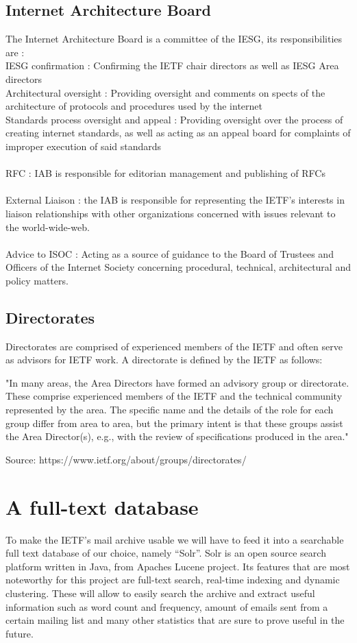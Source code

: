 \documentclass{report}
\begin{document}
\section{Internet Architecture Board}
The Internet Architecture Board is a committee of the IESG, its responsibilities are :\\
IESG confirmation : Confirming the IETF chair directors as well as IESG Area directors
\\Architectural oversight : Providing oversight and comments on spects of the architecture of protocols and procedures used by the internet 
\\Standards process oversight and appeal : Providing oversight over the process of creating internet standards, as well as acting as an appeal board for complaints of improper execution of said standards\\
\\RFC  : IAB is responsible for editorian management and publishing of RFCs\\
\\External Liaison  : the IAB is responsible for representing the IETF’s interests in liaison relationships with other organizations concerned with issues relevant to the world-wide-web.\\
\\Advice to ISOC : Acting as a source of guidance to the Board of Trustees and Officers of the Internet Society concerning procedural, technical, architectural and policy matters. \\


\section{Directorates}
Directorates are comprised of experienced members of the IETF and often serve as advisors for IETF work. A directorate is defined by the IETF as follows:

"In many areas, the Area Directors have formed an advisory group or directorate. These comprise experienced members of the IETF and the technical community represented by the area. The specific name and the details of the role for each group differ from area to area, but the primary intent is that these groups assist the Area Director(s), e.g., with the review of specifications produced in the area."

Source: https://www.ietf.org/about/groups/directorates/

\chapter{A full-text database}
To make the IETF’s mail archive usable we will have to feed it into a searchable full text database of our choice, namely “Solr”. Solr is an open source search platform written in Java, from Apaches Lucene project. Its features that are most noteworthy for this project are full-text search, real-time indexing and dynamic clustering. These will allow to easily search the archive and extract useful information such as word count and frequency, amount of emails sent from a certain mailing list and many other statistics that are sure to prove useful in the future. 
\end{document}
